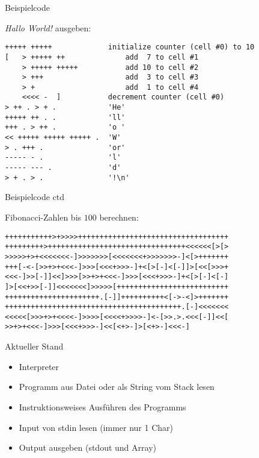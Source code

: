 \documentclass{beamer}
\begin{document}
\begin{frame}[fragile,c]{Beispielcode}

    \emph{Hallo World!} ausgeben:

    \begin{verbatim}
+++++ +++++             initialize counter (cell #0) to 10
[   > +++++ ++              add  7 to cell #1
    > +++++ +++++           add 10 to cell #2 
    > +++                   add  3 to cell #3
    > +                     add  1 to cell #4
    <<<< -  ]           decrement counter (cell #0)           
> ++ . > + .            'He'            
+++++ ++ . .            'll'
+++ . > ++ .            'o '
<< +++++ +++++ +++++ .  'W'
> . +++ .               'or'
----- - .               'l'
----- --- .             'd'
> + . > .               '!\n'
    \end{verbatim}

\end{frame}


\begin{frame}[fragile,c]{Beispielcode ctd}

    Fibonacci-Zahlen bis $100$ berechnen:

    \begin{verbatim}
+++++++++++>+>>>>+++++++++++++++++++++++++++++++++++
+++++++++>++++++++++++++++++++++++++++++++<<<<<<[>[>
>>>>>+>+<<<<<<<-]>>>>>>>[<<<<<<<+>>>>>>>-]<[>+++++++
+++[-<-[>>+>+<<<-]>>>[<<<+>>>-]+<[>[-]<[-]]>[<<[>>>+
<<<-]>>[-]]<<]>>>[>>+>+<<<-]>>>[<<<+>>>-]+<[>[-]<[-]
]>[<<+>>[-]]<<<<<<<]>>>>>[++++++++++++++++++++++++++
++++++++++++++++++++++.[-]]++++++++++<[->-<]>+++++++
+++++++++++++++++++++++++++++++++++++++++.[-]<<<<<<<
<<<<<[>>>+>+<<<<-]>>>>[<<<<+>>>>-]<-[>>.>.<<<[-]]<<[
>>+>+<<<-]>>>[<<<+>>>-]<<[<+>-]>[<+>-]<<<-]
    \end{verbatim}

\end{frame}

\begin{frame}{Aktueller Stand}

    \begin{itemize}
        \item Interpreter
        \item Programm aus Datei oder als String vom Stack lesen
        \item Instruktionsweises Ausführen des Programms
        \item Input von stdin lesen (immer nur 1 Char)
        \item Output ausgeben (stdout und Array)
    \end{itemize}

\end{frame}
\end{document}
